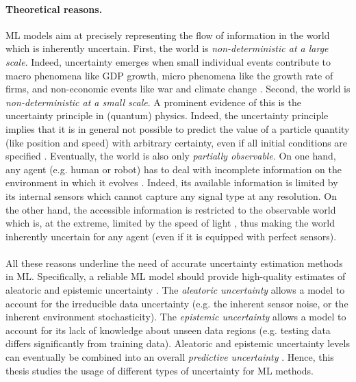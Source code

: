 \paragraph*{Theoretical reasons.} ML models aim at precisely representing the flow of information in the world which is inherently uncertain.
First, the world is \emph{non-deterministic at a large scale}. Indeed, uncertainty emerges when small individual events contribute to macro phenomena like GDP growth, micro phenomena like the growth rate of firms, and non-economic events like war and climate change \cite{macro-micro-uncertainty}.
Second, the world is \emph{non-deterministic at a small scale}. A prominent evidence of this is the uncertainty principle in (quantum) physics. Indeed, the uncertainty principle implies that it is in general not possible to predict the value of a particle quantity (like position and speed) with arbitrary certainty, even if all initial conditions are specified \cite{hilgevoord2016heisenberg}.
Eventually, the world is also only \emph{partially observable}. On one hand, any agent (e.g. human or robot) has to deal with incomplete information on the environment in which it evolves \cite{kaelbling1998pomdp}. Indeed, its available information is limited by its internal sensors which cannot capture any signal type at any resolution. On the other hand, the accessible information is restricted to the observable world which is, at the extreme, limited by the speed of light \cite{ord2021universe}, thus making the world inherently uncertain for any agent (even if it is equipped with perfect sensors).

\paragraph*{} All these reasons underline the need of accurate uncertainty estimation methods in ML. 
Specifically, a reliable ML model should provide high-quality estimates of aleatoric and epistemic uncertainty \citep{uncertainty-deep-learning}.
The \emph{aleatoric uncertainty} allows a model to account for the irreducible data uncertainty (e.g. the inherent sensor noise, or the inherent environment stochasticity).
The \emph{epistemic uncertainty} allows a model to account for its lack of knowledge about unseen data regions (e.g. testing data differs significantly from training data).
Aleatoric and epistemic uncertainty levels can eventually be combined into an overall \emph{predictive uncertainty} \citep{uncertainty-deep-learning}. Hence, this thesis studies the usage of different types of uncertainty for ML methods.


